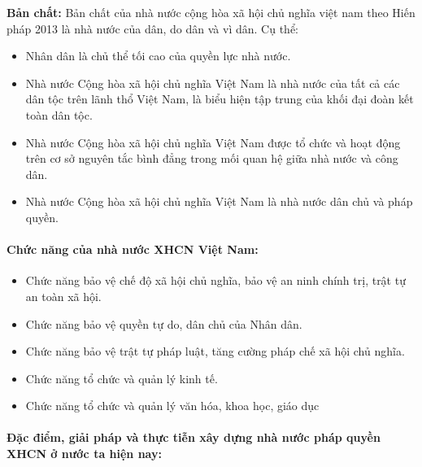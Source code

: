\textbf{Bản chất:} Bản chất của nhà nước cộng hòa xã hội chủ nghĩa việt nam theo Hiến pháp 2013 là nhà nước của dân, do dân và vì dân. Cụ thể:
\begin{itemize}
    \item Nhân dân là chủ thể tối cao của quyền lực nhà nước.
    \item Nhà nước Cộng hòa xã hội chủ nghĩa Việt Nam là nhà nước của tất cả các dân tộc trên lãnh thổ Việt Nam, là biểu hiện tập trung của khối đại đoàn kết toàn dân tộc.
    \item Nhà nước Cộng hòa xã hội chủ nghĩa Việt Nam được tổ chức và hoạt động trên cơ sở nguyên tắc bình đẳng trong mối quan hệ giữa nhà nước và công dân.
    \item Nhà nước Cộng hòa xã hội chủ nghĩa Việt Nam là nhà nước dân chủ và pháp quyền.
\end{itemize}
\paragraph*{{\textbf{Chức năng của nhà nước XHCN Việt Nam:}}}\mbox{}
\begin{itemize}
    \item Chức năng bảo vệ chế độ xã hội chủ nghĩa, bảo vệ an ninh chính trị, trật tự an toàn xã hội.
    \item Chức năng bảo vệ quyền tự do, dân chủ của Nhân dân.
    \item Chức năng bảo vệ trật tự pháp luật, tăng cường pháp chế xã hội chủ nghĩa.
    \item Chức năng tổ chức và quản lý kinh tế.
    \item Chức năng tổ chức và quản lý văn hóa, khoa học, giáo dục
\end{itemize}

\paragraph*{\textbf{Đặc điểm, giải pháp và thực tiễn xây dựng nhà nước pháp quyền XHCN ở nước ta hiện nay:}}\mbox{}

